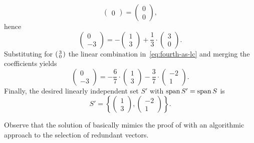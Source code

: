 \begin{probsol}
\[\begin{pmatrix}
   0
  \end{pmatrix}
  = 
  \begin{pmatrix}
   0\\
   0
  \end{pmatrix},
 \]
 hence
 \[
  \begin{pmatrix}
   0\\
   -3
  \end{pmatrix}
  = -
  \begin{pmatrix}
   1\\
   3
  \end{pmatrix}
  +\frac{1}{3} \cdot 
  \begin{pmatrix}
   3\\
   0
  \end{pmatrix}.
 \]
 Substituting for $\begin{psmallmatrix} 3\\0 \end{psmallmatrix}$ the linear
 combination in~\eqref{eq:fourth-as-lc} and merging the coefficients yields
 \[
  \begin{pmatrix}
   0\\
   -3
  \end{pmatrix}
  = -\frac{6}{7} \cdot 
  \begin{pmatrix}
   1\\
   3
  \end{pmatrix}
  -\frac{3}{7} \cdot 
  \begin{pmatrix}
   -2\\
   1
  \end{pmatrix}.
 \]
 Finally, the desired linearly independent set $S'$ with $\operatorname{span} S' = \operatorname{span} S$ is
 \[
  S' = \left\{ 
   \begin{pmatrix}
    1\\
    3
   \end{pmatrix},
   \begin{pmatrix}
    -2\\
    1
   \end{pmatrix}
  \right\}.
 \]
\end{probsol}

\begin{remark}{}{}
 Observe that the solution of  basically
 mimics the proof of  with an
 algorithmic approach to the selection of redundant vectors.
\end{remark}

